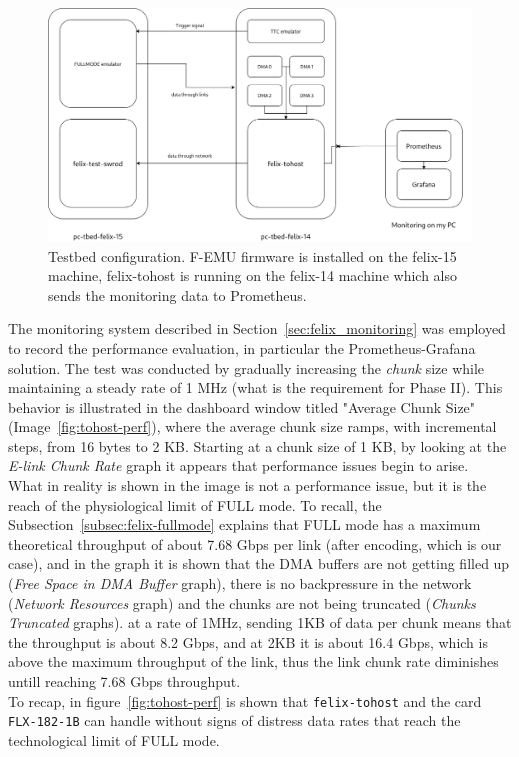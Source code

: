 \begin{figure}[htbp]
\centering
\includegraphics[width=\textwidth]{images/results/tohost-tbed-setup.png}
\caption{Testbed configuration. F-EMU firmware is installed on the felix-15 machine, felix-tohost is running on the felix-14 machine which also sends the monitoring data to Prometheus.}
\label{fig:tbed-setup}
\end{figure}

The monitoring system described in Section~\ref{sec:felix_monitoring} was employed to record the performance evaluation, in particular the Prometheus-Grafana solution. The test was conducted by gradually increasing the \emph{chunk} size while maintaining a steady rate of 1 MHz (what is the requirement for Phase II). This behavior is illustrated in the dashboard window titled "Average Chunk Size" (Image~\ref{fig:tohost-perf}), where the average chunk size ramps, with incremental steps, from 16 bytes to 2 KB. Starting at a chunk size of 1 KB, by looking at the \emph{E-link Chunk Rate} graph it appears that performance issues begin to arise.\\
What in reality is shown in the image is not a performance issue, but it is the reach of the physiological limit of FULL mode. To recall, the Subsection~\ref{subsec:felix-fullmode} explains that FULL mode has a maximum theoretical throughput of about 7.68 Gbps per link (after encoding, which is our case), and in the graph it is shown that the \acs{DMA} buffers are not getting filled up (\emph{Free Space in DMA Buffer} graph), there is no backpressure in the network (\emph{Network Resources} graph) and the chunks are not being truncated (\emph{Chunks Truncated} graphs). at a rate of 1MHz, sending 1KB of data per chunk means that the throughput is about 8.2 Gbps, and at 2KB it is about 16.4 Gbps, which is above the maximum throughput of the link, thus the link chunk rate diminishes untill reaching 7.68 Gbps throughput.\\ 
To recap, in figure~\ref{fig:tohost-perf} is shown that \texttt{felix-tohost} and the card \texttt{FLX-182-1B} can handle without signs of distress data rates that reach the technological limit of FULL mode.

